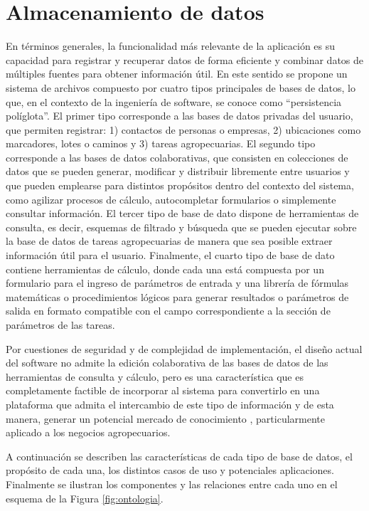 \section{Almacenamiento de datos} \label{sec:datos}

En términos generales, la funcionalidad más relevante de la aplicación es su capacidad para registrar y recuperar datos de forma eficiente y combinar datos de múltiples fuentes para obtener información útil. En este sentido se propone un sistema de archivos compuesto por cuatro tipos principales de bases de datos, lo que, en el contexto de la ingeniería de software, se conoce como ``persistencia políglota''. El primer tipo corresponde a las bases de datos privadas del usuario, que permiten registrar: 1) contactos de personas o empresas, 2) ubicaciones como marcadores, lotes o caminos y 3) tareas agropecuarias. El segundo tipo corresponde a las bases de datos colaborativas, que consisten en colecciones de datos que se pueden generar, modificar y distribuir libremente entre usuarios y que pueden emplearse para distintos propósitos dentro del contexto del sistema, como agilizar procesos de cálculo, autocompletar formularios o simplemente consultar información. El tercer tipo de base de dato dispone de herramientas de consulta, es decir, esquemas de filtrado y búsqueda que se pueden ejecutar sobre la base de datos de tareas agropecuarias de manera que sea posible extraer información útil para el usuario. Finalmente, el cuarto tipo de base de dato contiene herramientas de cálculo, donde cada una está compuesta por un formulario para el ingreso de parámetros de entrada y una librería de fórmulas matemáticas o procedimientos lógicos para generar resultados o parámetros de salida en formato compatible con el campo correspondiente a la sección de parámetros de las tareas.

Por cuestiones de seguridad y de complejidad de implementación, el diseño actual del software no admite la edición colaborativa de las bases de datos de las herramientas de consulta y cálculo, pero es una característica que es completamente factible de incorporar al sistema para convertirlo en una plataforma que admita el intercambio de este tipo de información y de esta manera, generar un potencial mercado de conocimiento \cite{kafentzis2004}, particularmente aplicado a los negocios agropecuarios. 

A continuación se describen las características de cada tipo de base de datos, el propósito de cada una, los distintos casos de uso y potenciales aplicaciones. Finalmente se ilustran los componentes y las relaciones entre cada uno en el esquema de la Figura \ref{fig:ontologia}.

